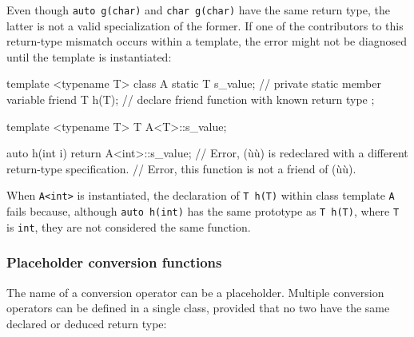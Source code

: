 \noindent Even though \lstinline!auto!~\lstinline!g(char)! and
\lstinline!char!~\lstinline!g(char)! have the same return type, the latter is
not a valid specialization of the former. If one of the contributors to
this return-type mismatch occurs within a template, the error might not
be diagnosed until the template is instantiated:

\begin{emcppslisting}[emcppsstandards={c++14}]
template <typename T>
class A
{
    static T s_value;  // private static member variable
    friend T h(T);     // declare friend function with known return type
};

template <typename T> T A<T>::s_value;

auto h(int i)
{
    return A<int>::s_value;
        // Error, (ù{}ù) is redeclared with a different return-type specification.
        // Error, this function is not a friend of (ù{}ù).
}
\end{emcppslisting}
    

\noindent When \lstinline!A<int>! is instantiated, the declaration of
\lstinline!T!~\lstinline!h(T)! within class template \lstinline!A! fails because,
although \lstinline!auto!~\lstinline!h(int)! has the same prototype as
\lstinline!T!~\lstinline!h(T)!, where \lstinline!T! is \lstinline!int!, they are not
considered the same function.

\subsubsection[Placeholder conversion functions]{Placeholder conversion functions}\label{placeholder-conversion-functions}

The name of a conversion operator can be a placeholder. Multiple
conversion operators can be defined in a single class, provided that no
two have the same declared or deduced return type:


